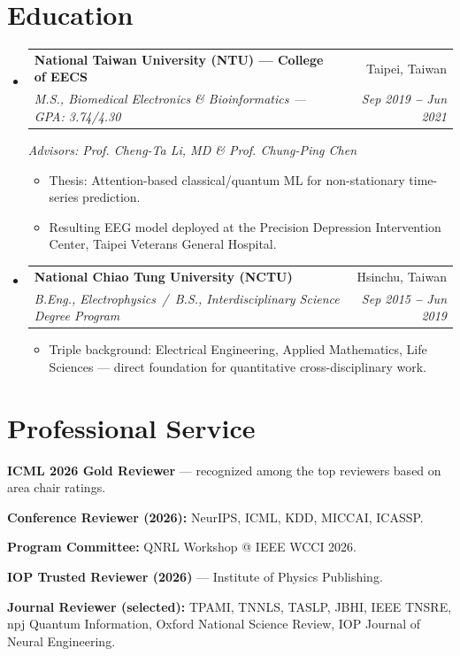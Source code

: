 \documentclass[letterpaper,10pt]{article}
\makeatletter
\newcommand{\resumeItem}[1]{
  \item\small{
    {#1 \vspace{-2pt}}
  }
}
\newcommand{\resumeSubheading}[4]{
  \vspace{-2pt}\item
    \begin{tabular*}{0.97\textwidth}[t]{l@{\extracolsep{\fill}}r}
      \textbf{#1} & #2 \\
      \textit{\small#3} & \textit{\small #4} \\
    \end{tabular*}\vspace{-7pt}
}
\newcommand{\resumeSubHeadingListStart}{\begin{itemize}[leftmargin=0.15in, label={}]}
\newcommand{\resumeSubHeadingListEnd}{\end{itemize}}
\newcommand{\resumeItemListStart}{\begin{itemize}}
\newcommand{\resumeItemListEnd}{\end{itemize}\vspace{-5pt}}
\makeatother
\begin{document}

\section{Education}
  \vspace{3pt}
  \resumeSubHeadingListStart

    \resumeSubheading
      {National Taiwan University (NTU) --- College of EECS}{Taipei, Taiwan}
      {M.S., Biomedical Electronics \& Bioinformatics --- GPA: 3.74/4.30}{Sep 2019 \textbf{--} Jun 2021}

      \emph{Advisors: Prof. Cheng-Ta Li, MD \& Prof. Chung-Ping Chen}
        \resumeItemListStart
            \resumeItem{Thesis: Attention-based classical/quantum ML for non-stationary time-series prediction.}
            \resumeItem{Resulting EEG model deployed at the Precision Depression Intervention Center, Taipei Veterans General Hospital.}
        \resumeItemListEnd

    \resumeSubheading
      {National Chiao Tung University (NCTU)}{Hsinchu, Taiwan}
      {B.Eng., Electrophysics \,/\, B.S., Interdisciplinary Science Degree Program}{Sep 2015 \textbf{--} Jun 2019}
        \resumeItemListStart
            \resumeItem{Triple background: Electrical Engineering, Applied Mathematics, Life Sciences --- direct foundation for quantitative cross-disciplinary work.}
        \resumeItemListEnd

  \resumeSubHeadingListEnd


\section{Professional Service}
    \vspace{2pt}
  \resumeSubHeadingListStart
    \small{\item{
    \textbf{ICML 2026 Gold Reviewer} --- recognized among the top reviewers based on area chair ratings.
    }}
    \small{\item{
    \textbf{Conference Reviewer (2026):} NeurIPS, ICML, KDD, MICCAI, ICASSP.
    }}
    \small{\item{
    \textbf{Program Committee:} QNRL Workshop @ IEEE WCCI 2026.
    }}
    \small{\item{
    \textbf{IOP Trusted Reviewer (2026)} --- Institute of Physics Publishing.
    }}
    \small{\item{
    \textbf{Journal Reviewer (selected):} TPAMI, TNNLS, TASLP, JBHI, IEEE TNSRE, npj Quantum Information, Oxford National Science Review, IOP Journal of Neural Engineering.
    }}
  \resumeSubHeadingListEnd
\end{document}
